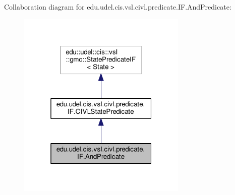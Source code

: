 Collaboration diagram for edu.\+udel.\+cis.\+vsl.\+civl.\+predicate.\+I\+F.\+And\+Predicate\+:
\nopagebreak
\begin{figure}[H]
\begin{center}
\leavevmode
\includegraphics[width=229pt]{interfaceedu_1_1udel_1_1cis_1_1vsl_1_1civl_1_1predicate_1_1IF_1_1AndPredicate__coll__graph}
\end{center}
\end{figure}

